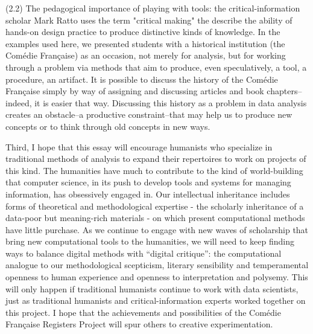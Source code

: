\documentclass[	DIV=calc,%
							paper=a4,%
							fontsize=11pt,%
							twocolumn]{scrartcl}	 					%
\begin{document}
(2.2) The pedagogical importance of playing with tools: the critical-information scholar Mark Ratto uses the term "critical making" the describe the ability of hands-on design practice to produce distinctive kinds of knowledge.  In the examples used here, we presented students with a historical institution (the Comédie Française) as an occasion, not merely for analysis, but for working through a problem via methods that aim to produce, even speculatively, a tool, a procedure, an artifact.  It is possible to discuss the history of the Comédie Française simply by way of assigning and discussing articles and book chapters--indeed, it is easier that way.  Discussing this history as a problem in data analysis creates an obstacle--a productive constraint--that may help us to produce new concepts or to think through old concepts in new ways.

Third, I hope that this essay will encourage humanists who specialize in traditional methods of analysis to expand their repertoires to work on projects of this kind.  The humanities have much to contribute to the kind of world-building that computer science, in its push to develop tools and systems for managing information, has obsessively engaged in.  Our intellectual inheritance includes forms of theoretical and methodological expertise - the scholarly inheritance of a data-poor but meaning-rich materials - on which present computational methods have little purchase.  As we continue to engage with new waves of scholarship that bring new computational tools to the humanities, we will need to keep finding ways to balance digital methods with ``digital critique'': the computational analogue to our methodological scepticism, literary sensibility and temperamental openness to human experience and openness to interpretation and polysemy.  This will only happen if traditional humanists continue to work with data scientists, just as traditional humanists and critical-information experts worked together on this project.  I hope that the achievements and possibilities of the Comédie Française Registers Project will spur others to creative experimentation.

\printbibliography
\end{document}
